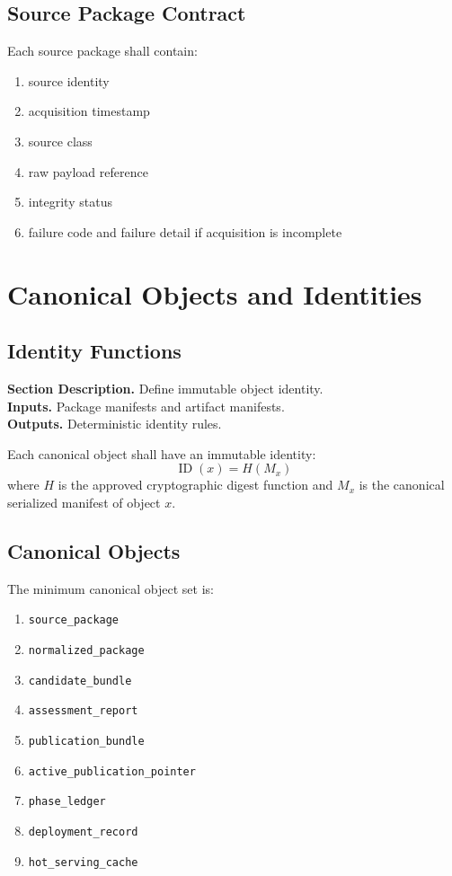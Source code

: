 \documentclass[11pt]{report}
\newcommand{\meta}[3]{\textbf{Section Description.} #1\\
\textbf{Inputs.} #2\\
\textbf{Outputs.} #3\par}
\begin{document}
\section{Source Package Contract}
Each source package shall contain:
\begin{enumerate}[leftmargin=1.2cm]
    \item source identity
    \item acquisition timestamp
    \item source class
    \item raw payload reference
    \item integrity status
    \item failure code and failure detail if acquisition is incomplete
\end{enumerate}
\chapter{Canonical Objects and Identities}
\section{Identity Functions}
\meta{Define immutable object identity.}{Package manifests and artifact manifests.}{Deterministic identity rules.}

Each canonical object shall have an immutable identity:
\[
\operatorname{ID}(x) = H(M_x)
\]
where \(H\) is the approved cryptographic digest function and \(M_x\) is the canonical serialized manifest of object \(x\).

\section{Canonical Objects}
The minimum canonical object set is:
\begin{enumerate}[leftmargin=1.2cm]
    \item \texttt{source\_package}
    \item \texttt{normalized\_package}
    \item \texttt{candidate\_bundle}
    \item \texttt{assessment\_report}
    \item \texttt{publication\_bundle}
    \item \texttt{active\_publication\_pointer}
    \item \texttt{phase\_ledger}
    \item \texttt{deployment\_record}
    \item \texttt{hot\_serving\_cache}
\end{enumerate}
\end{document}
